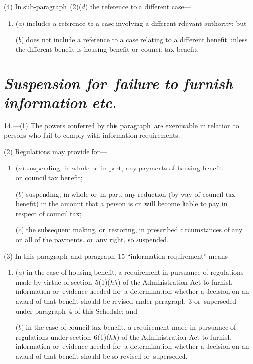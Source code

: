 \documentclass[12pt,a4paper]{article}
\begin{document}
(4) In sub-paragraph~(2)($d$)  the reference to a different case—
\begin{enumerate}\item[]
($a$) includes a reference to a case involving a different relevant authority; but

($b$) does not include a reference to a case relating to a different benefit unless the different benefit is housing benefit or~council tax benefit.
\end{enumerate}


\section*{\itshape Suspension for~failure to furnish information etc.}

14.---(1) The powers conferred by this paragraph~are exercisable in relation to persons who fail to comply with information requirements.

(2) Regulations may provide for—
\begin{enumerate}\item[]
($a$) suspending, in whole or~in part, any payments of housing benefit or~council tax benefit;

($b$) suspending, in whole or~in part, any reduction (by way of council tax benefit) in the amount that a person is or~will become liable to pay in respect of council tax;

($c$) the subsequent making, or~restoring, in prescribed circumstances of any or~all of the payments, or~any right, so suspended.
\end{enumerate}

(3) In this paragraph~and paragraph~15 “information requirement” means—
\begin{enumerate}\item[]
($a$) in the case of housing benefit, a requirement in pursuance of regulations made by virtue of section~5(1)($hh$)  of the Administration Act to furnish information or~evidence needed for~a determination whether a decision on an award of that benefit should be revised under paragraph~3 or~superseded under paragraph~4 of this Schedule; and

($b$) in the case of council tax benefit, a requirement made in pursuance of regulations under section~6(1)($hh$)  of the Administration Act to furnish information or~evidence needed for~a determination whether a decision on an award of that benefit should be so revised or~superseded.
\end{enumerate}
\end{document}
